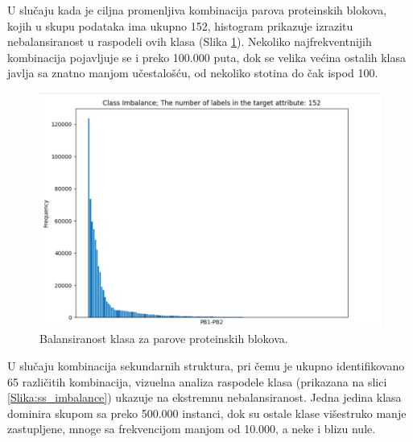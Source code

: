 \documentclass[a4paper,12pt]{article}
\begin{document}
U slučaju kada je ciljna promenljiva kombinacija parova proteinskih blokova, kojih u skupu podataka ima ukupno 152, histogram prikazuje izrazitu nebalansiranost u raspodeli ovih klasa (Slika \ref{Slika:pb_imbalance}). Nekoliko najfrekventnijih kombinacija pojavljuje se i preko 100.000 puta, dok se velika većina ostalih klasa javlja sa znatno manjom učestalošću, od nekoliko stotina do čak ispod 100.
\begin{figure}[htbp]
    \centering
    \includegraphics[width=1\textwidth]{./images/pb_imbalance.png}
    \caption{Balansiranost klasa za parove proteinskih blokova.}
    \label{Slika:pb_imbalance}
\end{figure}

U slučaju kombinacija sekundarnih struktura, pri čemu je ukupno identifikovano 65 različitih kombinacija, vizuelna analiza raspodele klasa (prikazana na slici \ref{Slika:ss_imbalance}) ukazuje na ekstremnu nebalansiranost. Jedna jedina klasa dominira skupom sa preko 500.000 instanci, dok su ostale klase višestruko manje zastupljene, mnoge sa frekvencijom manjom od 10.000, a neke i blizu nule.
\end{document}
